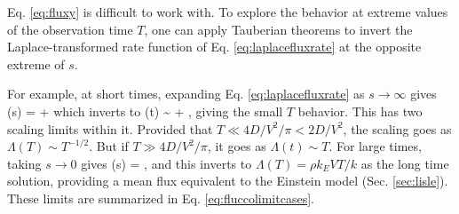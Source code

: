\label{sec:fluxlimits}
Eq. \ref{eq:fluxy} is difficult to work with. To explore the behavior at extreme values of the observation time $T$, one can apply Tauberian theorems \citep{Weiss1994} to invert the Laplace-transformed rate function of Eq. \ref{eq:laplacefluxrate} at the opposite extreme of $s$.
	
For example, at short times, expanding Eq. \ref{eq:laplacefluxrate} as $s\rightarrow \infty$ gives
\be \tilde{\Lambda}(s) =  +  \ee
which inverts to
\be \Lambda(t) \sim {} + ,\ee
giving the small $T$ behavior.
This has two scaling limits within it. Provided that $T \ll 4D/V^2/\pi < 2 D/V^2$, the scaling goes as $\Lambda(T) \sim T^{-1/2}$. But if $T\gg 4D/V^2/\pi$, it goes as $\Lambda(t) \sim T$.
For large times, taking $s\rightarrow 0 $ gives
\be \tilde{\Lambda}(s) = , \ee
and this inverts to $\Lambda(T) = \rho k_E V T/k$ as the long time solution, providing a mean flux equivalent to the Einstein model (Sec. \ref{sec:lisle}).
These limits are summarized in Eq. \ref{eq:fluccolimitcases}.
